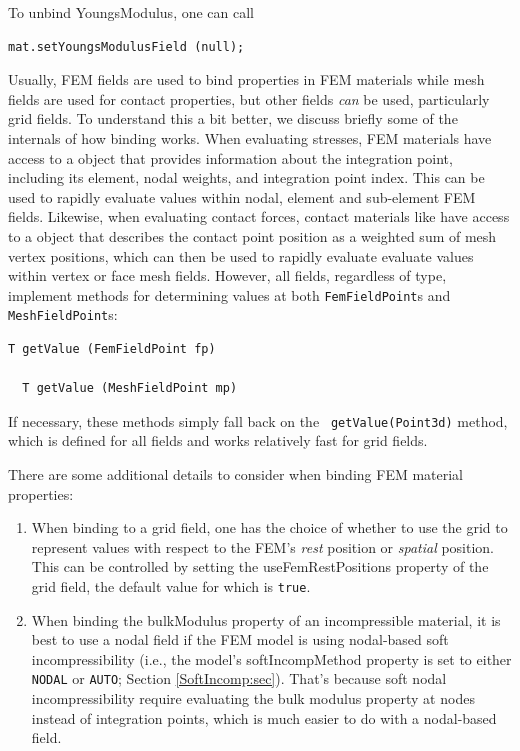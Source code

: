 To unbind {\sf YoungsModulus}, one can call
%
\begin{lstlisting}[]
   mat.setYoungsModulusField (null);
\end{lstlisting}
%

Usually, FEM fields are used to bind properties in FEM materials while
mesh fields are used for contact properties, but other fields {\it
can} be used, particularly grid fields. To understand this a bit
better, we discuss briefly some of the internals of how binding
works. When evaluating stresses, FEM materials have access to a
 object that
provides information about the integration point, including its
element, nodal weights, and integration point index. This can be used
to rapidly evaluate values within nodal, element and sub-element FEM
fields. Likewise, when evaluating contact forces, contact materials
like  have
access to a 
object that describes the contact point position as a weighted sum of
mesh vertex positions, which can then be used to rapidly evaluate
evaluate values within vertex or face mesh fields.  However, all
fields, regardless of type, implement methods for determining values
at both {\tt FemFieldPoint}s and {\tt MeshFieldPoint}s:
%
\begin{lstlisting}[]
  T getValue (FemFieldPoint fp)

  T getValue (MeshFieldPoint mp)
\end{lstlisting}
%
If necessary, these methods simply fall back on the {\tt
getValue(Point3d)} method, which is defined for all fields and works
relatively fast for grid fields.

There are some additional details to consider when binding FEM
material properties:

\begin{enumerate}

\item When binding to a grid field, one has the choice of whether to
use the grid to represent values with respect to the FEM's {\it rest}
position or {\it spatial} position. This can be controlled by setting
the {\sf useFemRestPositions} property of the grid field, the default
value for which is {\tt true}.

\item When binding the {\sf bulkModulus} property of an incompressible
material, it is best to use a nodal field if the FEM model is using
nodal-based soft incompressibility (i.e., the model's {\sf
softIncompMethod} property is set to either {\tt NODAL} or {\tt AUTO};
Section \ref{SoftIncomp:sec}). That's because soft nodal
incompressibility require evaluating the bulk modulus property at
nodes instead of integration points, which is much easier to do with a
nodal-based field.

\end{enumerate}

